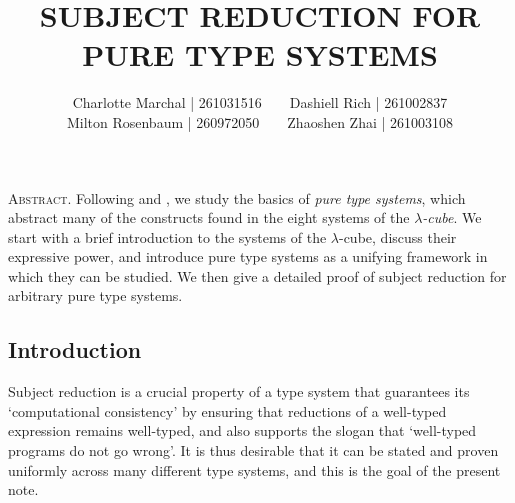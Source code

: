 \documentclass[reqno, twoside]{article}
\begin{document}
    \title{\textbf{\normalsize\MakeUppercase{Subject Reduction for Pure Type Systems}}}
    \author{\small Charlotte Marchal | 261031516\ \ \ \ Dashiell Rich | 261002837\\\small Milton Rosenbaum | 260972050\ \ \ \ Zhaoshen Zhai | 261003108}
    \date{}
    \maketitle

    \begin{center}
        \vspace{-0.3in}
        \begin{minipage}{0.85\textwidth}
            {\footnotesize{\textsc{Abstract.}} Following \cite{GN91} and \cite{Bar91}, we study the basics of \textit{pure type systems}, which abstract many of the constructs found in the eight systems of the \textit{$\lambda$-cube}. We start with a brief introduction to the systems of the $\lambda$-cube, discuss their expressive power, and introduce pure type systems as a unifying framework in which they can be studied. We then give a detailed proof of subject reduction for arbitrary pure type systems.}
        \end{minipage}
    \end{center}

    \subsection*{Introduction}
    
    Subject reduction is a crucial property of a type system that guarantees its `computational consistency' by ensuring that reductions of a well-typed expression remains well-typed, and also supports the slogan that `well-typed programs do not go wrong'. It is thus desirable that it can be stated and proven uniformly across many different type systems, and this is the goal of the present note.
\end{document}

